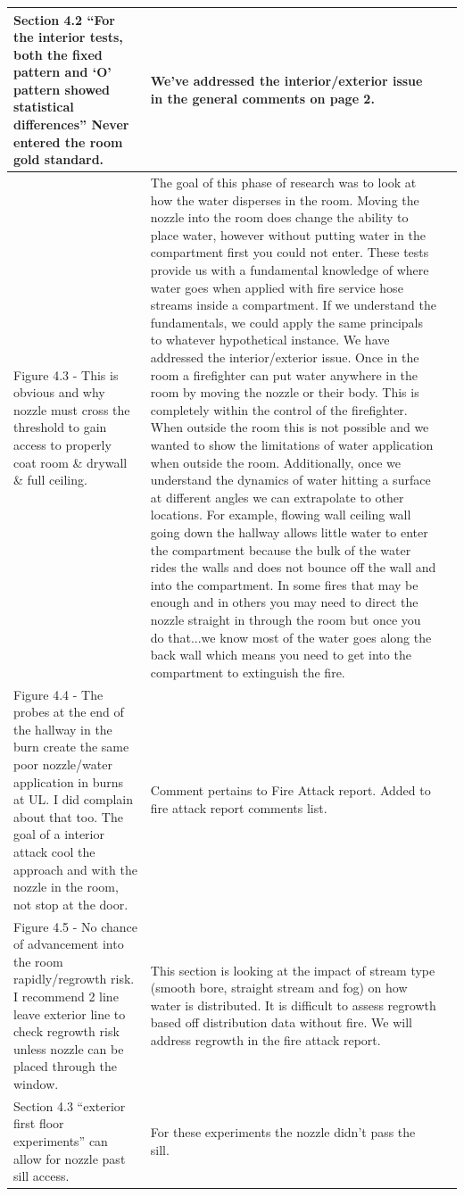 \documentclass[12pt,oneside]{book}
\begin{document}
\begin{landscape}
\begin{longtable}{|L{4in}|L{3.75in}|c|}
		\hline
		Section 4.2 ``For the interior tests, both the fixed pattern and `O' pattern showed statistical differences'' Never entered the room gold standard. &
		We've addressed the interior/exterior issue in the general comments on page 2. & \\

		\hline
		Figure 4.3 - This is obvious and why nozzle must cross the threshold to gain access to properly coat room \& drywall \& full ceiling. &
		The goal of this phase of research was to look at how the water disperses in the room. Moving the nozzle into the room does change the ability to place water, however without putting water in the compartment first you could not enter. These tests provide us with a fundamental knowledge of where water goes when applied with fire service hose streams inside a compartment. If we understand the fundamentals, we could apply the same principals to whatever hypothetical instance. We have addressed the interior/exterior issue. Once in the room a firefighter can put water anywhere in the room by moving the nozzle or their body.  This is completely within the control of the firefighter.  When outside the room this is not possible and we wanted to show the limitations of water application when outside the room.  Additionally, once we understand the dynamics of water hitting a surface at different angles we can extrapolate to other locations. For example, flowing wall ceiling wall going down the hallway allows little water to enter the compartment because the bulk of the water rides the walls and does not bounce off the wall and into the compartment.  In some fires that may be enough and in others you may need to direct the nozzle straight in through the room but once you do that...we know most of the water goes along the back wall which means you need to get into the compartment to extinguish the fire.  & \\

		\hline
		Figure 4.4 - The probes at the end of the hallway in the burn create the same poor nozzle/water application in burns at UL. I did complain about that too. The goal of a interior attack cool the approach and with the nozzle in the room, not stop at the door. & 
		Comment pertains to Fire Attack report. Added to fire attack report comments list. & \\

		\hline 
		Figure 4.5 - No chance of advancement into the room rapidly/regrowth risk. I recommend 2 line leave exterior line to check regrowth risk unless nozzle can be placed through the window. & 
		This section is looking at the impact of stream type (smooth bore, straight stream and fog) on how water is distributed. It is difficult to assess regrowth based off distribution data without fire. We will address regrowth in the fire attack report. & \\ 
		\hline
		Section 4.3 ``exterior first floor experiments'' can allow for nozzle past sill access. & For these experiments the nozzle didn't pass the sill. & \\


\end{longtable}
\end{landscape}
\end{document}
